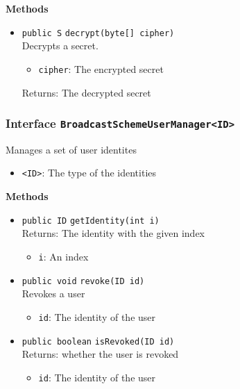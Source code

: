 \textbf{Methods}
\begin{itemize}
\item \lstinline|public S| \lstinline|decrypt|\lstinline|(byte[] cipher)|\\
Decrypts a secret.
\begin{itemize}
\item \lstinline|cipher|: The encrypted secret
\end{itemize}

Returns: The decrypted secret

\end{itemize}

\subsubsection{Interface \lstinline|BroadcastSchemeUserManager<ID>|}
Manages a set of user identites \\


\begin{itemize}
\item \lstinline|<ID>|: The type of the identities
\end{itemize}



\textbf{Methods}
\begin{itemize}
\item \lstinline|public ID| \lstinline|getIdentity|\lstinline|(int i)|\\
Returns: The identity with the given index
\begin{itemize}
\item \lstinline|i|: An index
\end{itemize}



\item \lstinline|public void| \lstinline|revoke|\lstinline|(ID id)|\\
Revokes a user
\begin{itemize}
\item \lstinline|id|: The identity of the user
\end{itemize}



\item \lstinline|public boolean| \lstinline|isRevoked|\lstinline|(ID id)|\\
Returns: whether the user is revoked
\begin{itemize}
\item \lstinline|id|: The identity of the user
\end{itemize}



\end{itemize}

